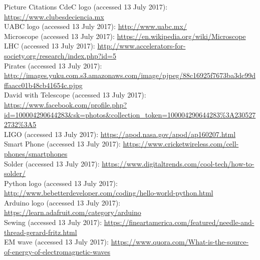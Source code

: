 \documentclass{beamer}
\begin{document}
\begin{frame}{Picture Citations}
\fontsize{5}{4}\selectfont 
CdeC logo (accessed 13 July 2017): \href{https://www.clubesdeciencia.mx}{https://www.clubesdeciencia.mx}\\
UABC logo (accessed 13 July 2017): \href{http://www.uabc.mx/}{http://www.uabc.mx/}\\
Microscope (accessed 13 July 2017): \href{https://en.wikipedia.org/wiki/Microscope}{https://en.wikipedia.org/wiki/Microscope}\\
LHC (accessed 13 July 2017): \href{http://www.accelerators-for-society.org/research/index.php?id=5}{http://www.accelerators-for-society.org/research/index.php?id=5}\\
Pirates (accessed 13 July 2017): \href{http://images.yuku.com.s3.amazonaws.com/image/pjpeg/88c16925f7673ba3dc99dffaacc01b48cb41654c.pjpg}{http://images.yuku.com.s3.amazonaws.com/image/pjpeg/88c16925f7673ba3dc99dffaacc01b48cb41654c.pjpg}\\
David with Telescope (accessed 13 July 2017): \href{https://www.facebook.com/profile.php?id=100004290644283\&sk=photos\&collection\_token=100004290644283\%3A2305272732\%3A5}{https://www.facebook.com/profile.php?id=100004290644283\&sk=photos\&collection\_token=100004290644283\%3A2305272732\%3A5}\\
LIGO (accessed 13 July 2017): \href{https://apod.nasa.gov/apod/ap160207.html}{https://apod.nasa.gov/apod/ap160207.html}\\
Smart Phone (accessed 13 July 2017): \href{https://www.cricketwireless.com/cell-phones/smartphones}{https://www.cricketwireless.com/cell-phones/smartphones}\\
Solder (accessed 13 July 2017): \href{https://www.digitaltrends.com/cool-tech/how-to-solder/}{https://www.digitaltrends.com/cool-tech/how-to-solder/}\\
Python logo (accessed 13 July 2017): \href{http://www.bebetterdeveloper.com/coding/hello-world-python.html}{http://www.bebetterdeveloper.com/coding/hello-world-python.html}\\
Arduino logo (accessed 13 July 2017): \href{https://learn.adafruit.com/category/arduino}{https://learn.adafruit.com/category/arduino}\\
Sewing (accessed 13 July 2017): \href{https://fineartamerica.com/featured/needle-and-thread-gerard-fritz.html}{https://fineartamerica.com/featured/needle-and-thread-gerard-fritz.html}\\
EM wave (accessed 13 July 2017): \href{https://www.quora.com/What-is-the-source-of-energy-of-electromagnetic-waves}{https://www.quora.com/What-is-the-source-of-energy-of-electromagnetic-waves}\\

\end{frame}
\end{document}
